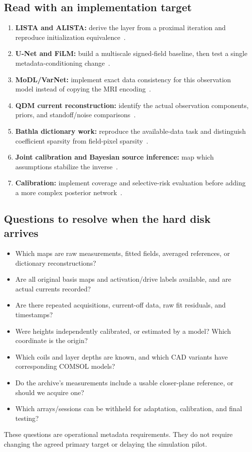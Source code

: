 \subsection{Read with an implementation target}
\begin{enumerate}
\item \textbf{LISTA and ALISTA:} derive the layer from a proximal iteration and reproduce initialization equivalence~\cite{lista,alista}.
\item \textbf{U-Net and FiLM:} build a multiscale signed-field baseline, then test a single metadata-conditioning change~\cite{unet,film}.
\item \textbf{MoDL/VarNet:} implement exact data consistency for this observation model instead of copying the MRI encoding~\cite{modl,varnet}.
\item \textbf{QDM current reconstruction:} identify the actual observation components, priors, and standoff/noise comparisons~\cite{midha,reed,broadway}.
\item \textbf{Bathla dictionary work:} reproduce the available-data task and distinguish coefficient sparsity from field-pixel sparsity~\cite{bathla}.
\item \textbf{Joint calibration and Bayesian source inference:} map which assumptions stabilize the inverse~\cite{setescak,clement,blinddps}.
\item \textbf{Calibration:} implement coverage and selective-risk evaluation before adding a more complex posterior network~\cite{guo,conformal}.
\end{enumerate}

\subsection{Questions to resolve when the hard disk arrives}
\begin{itemize}
\item Which maps are raw measurements, fitted fields, averaged references, or dictionary reconstructions?
\item Are all original basis maps and activation/drive labels available, and are actual currents recorded?
\item Are there repeated acquisitions, current-off data, raw fit residuals, and timestamps?
\item Were heights independently calibrated, or estimated by a model? Which coordinate is the origin?
\item Which coils and layer depths are known, and which CAD variants have corresponding COMSOL models?
\item Do the archive's measurements include a usable closer-plane reference, or should we acquire one?
\item Which arrays/sessions can be withheld for adaptation, calibration, and final testing?
\end{itemize}
These questions are operational metadata requirements. They do not require changing the agreed primary target or delaying the simulation pilot.

